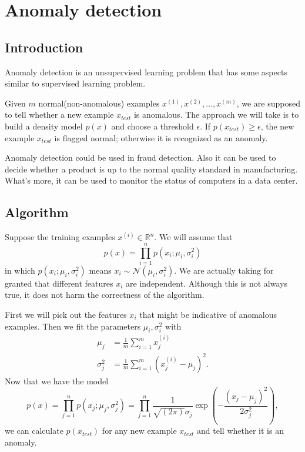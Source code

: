 \ifx\PREAMBLE\undefined


\fi
\section{Anomaly detection}
\subsection{Introduction}
Anomaly detection is an unsupervised learning problem that has some aspects similar to supervised learning problem. 

Given $m$ normal(non-anomalous) examples $x^{(1)}, x^{(2)}, \dots, x^{(m)}$, we are supposed to tell whether a new example $x_{test}$ is anomalous. The approach we will take is to build a density model $p(x)$ and choose a threshold $\epsilon$. If $p(x_{test}) \ge \epsilon$, the new example $x_{test}$ is flagged normal; otherwise it is recognized as an anomaly.  

Anomaly detection could be used in fraud detection. Also it can be used to decide whether a product is up to the normal quality standard in manufacturing. What's more, it can be used to monitor the status of computers in a data center.
\subsection{Algorithm}
Suppose the training examples $x^{(i)}\in \mathbb{R}^n$. We will assume that 
\begin{equation*}
p(x) = \prod\limits_{i=1}^{n}p(x_i;\mu_i, \sigma_i^2)
\end{equation*}
in which $p(x_i;\mu_i, \sigma_i^2)$ means $x_i\sim \mathcal{N}(\mu_i, \sigma_i^2)$. We are actually taking for granted that different features $x_i$ are independent. Although this is not always true, it does not harm the correctness of the algorithm.

First we will pick out the features $x_i$ that might be indicative of anomalous examples. Then we fit the parameters $\mu_i, \sigma_i^2$ with 
\begin{equation}
\begin{split}
\mu_j &= \frac{1}{m}\sum\limits_{i=1}^{m}x_j^{(i)}\\
\sigma_j^2 &= \frac{1}{m}\sum\limits_{i=1}^{m}(x_j^{(i)} - \mu_j)^2.
\end{split}\end{equation}
Now that we have the model
\begin{equation}
p(x) = \prod\limits_{j=1}^{n}p(x_j;\mu_j, \sigma_j^2) = \prod\limits_{j=1}^{n}\frac{1}{\sqrt{(2\pi)}\sigma_j}\exp\left(-\frac{(x_j-\mu_j)^2}{2\sigma_j^2}\right),
\end{equation}
we can calculate $p(x_{test})$ for any new example $x_{test}$ and tell whether it is an anomaly.
